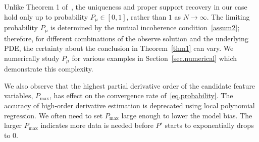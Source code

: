 \documentclass[a4paper,11pt]{article}
\begin{document}
Unlike Theorem 1 of~\cite{wainwright2009sharp}, the uniqueness and proper support recovery in our case hold only up to probability $P_\mu\in [0,1]$, rather than $1$ as $N\to\infty$. The limiting probability $P_\mu$ is determined by the mutual incoherence condition~\eqref{assum2}; therefore, for different combinations of the observe solution and the underlying PDE, the certainty about the conclusion in Theorem~\ref{thm1} can vary. We numerically study $P_\mu$ for various examples in Section~\ref{sec.numerical} which demonstrate this complexity.

We also observe that the highest partial derivative order of the candidate feature variables, $P_{\max}$, has effect on the convergence rate of~\eqref{eq.probability}. The accuracy of high-order derivative estimation is deprecated using local polynomial regression. We  often need to set $P_{\max}$ large enough to lower the model bias.  The larger $P_{\max}$ indicates more data is needed before $P'$ starts to exponentially drops to $0$.
\end{document}
